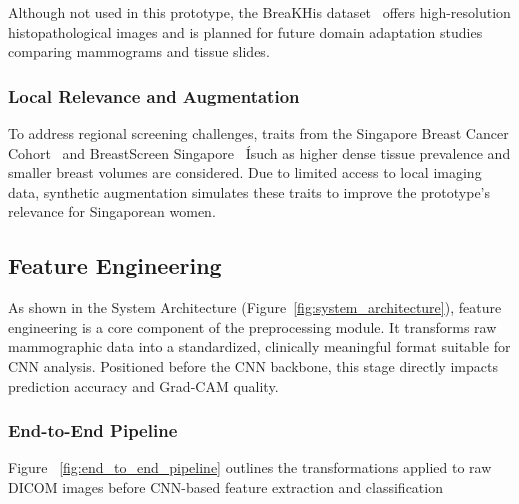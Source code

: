 \documentclass[12pt]{article}
\begin{document}
Although not used in this prototype, the BreaKHis dataset~\cite{19} offers high-resolution histopathological images and is planned for future domain adaptation studies comparing mammograms and tissue slides.

\subsubsection{Local Relevance and Augmentation}
To address regional screening challenges, traits from the Singapore Breast Cancer Cohort~\cite{6} and BreastScreen Singapore~\cite{10} Ísuch as higher dense tissue prevalence and smaller breast volumes are considered. Due to limited access to local imaging data, synthetic augmentation simulates these traits to improve the prototype’s relevance for Singaporean women.

\subsection{Feature Engineering}
\label{subsection:Feature Engineering}

As shown in the System Architecture (Figure~\ref{fig:system_architecture}), feature engineering is a core component of the preprocessing module. It transforms raw mammographic data into a standardized, clinically meaningful format suitable for CNN analysis. Positioned before the CNN backbone, this stage directly impacts prediction accuracy and Grad-CAM quality.

\subsubsection{End-to-End Pipeline}
Figure ~\ref{fig:end_to_end_pipeline} outlines the transformations applied to raw DICOM images before CNN-based feature extraction and classification
\end{document}
